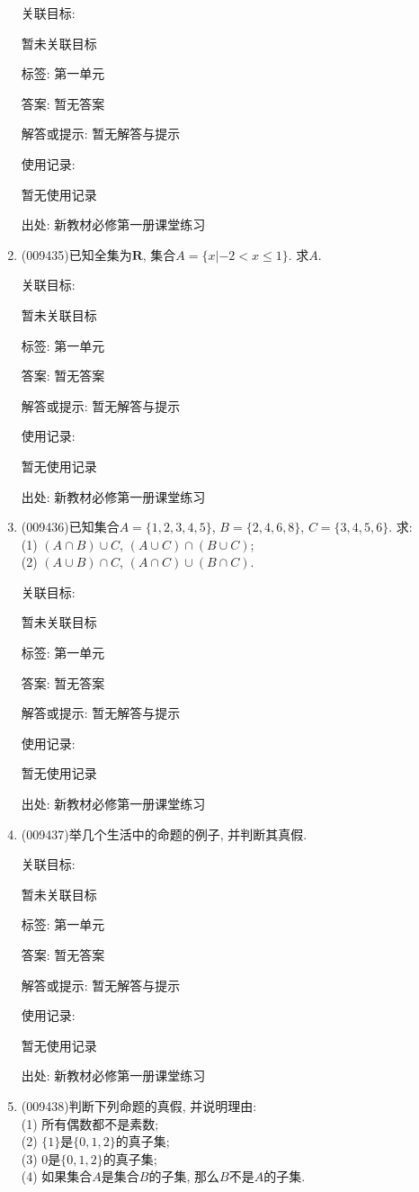 \documentclass[10pt,a4paper]{article}
\begin{document}
\begin{enumerate}[1.]
关联目标:

暂未关联目标



标签: 第一单元

答案: 暂无答案

解答或提示: 暂无解答与提示

使用记录:

暂无使用记录


出处: 新教材必修第一册课堂练习
\item { (009435)}已知全集为$\mathbf{R}$, 集合$A=\{x|-2<x\le 1\}$. 求$A$.


关联目标:

暂未关联目标



标签: 第一单元

答案: 暂无答案

解答或提示: 暂无解答与提示

使用记录:

暂无使用记录


出处: 新教材必修第一册课堂练习
\item { (009436)}已知集合$A=\{1, 2, 3, 4, 5\}$, $B=\{2, 4, 6, 8\}$, $C=\{3, 4, 5, 6\}$. 求:\\
(1) $(A\cap B)\cup C$, $(A\cup C)\cap (B\cup C)$;\\
(2) $(A\cup B)\cap C$, $(A\cap C)\cup (B\cap C)$.


关联目标:

暂未关联目标



标签: 第一单元

答案: 暂无答案

解答或提示: 暂无解答与提示

使用记录:

暂无使用记录


出处: 新教材必修第一册课堂练习
\item { (009437)}举几个生活中的命题的例子, 并判断其真假.


关联目标:

暂未关联目标



标签: 第一单元

答案: 暂无答案

解答或提示: 暂无解答与提示

使用记录:

暂无使用记录


出处: 新教材必修第一册课堂练习
\item { (009438)}判断下列命题的真假, 并说明理由:\\
(1) 所有偶数都不是素数;\\
(2) $\{1\}$是$\{0, 1, 2\}$的真子集;\\
(3) $0$是$\{0, 1, 2\}$的真子集;\\
(4) 如果集合$A$是集合$B$的子集, 那么$B$不是$A$的子集.



\end{enumerate}
\end{document}
